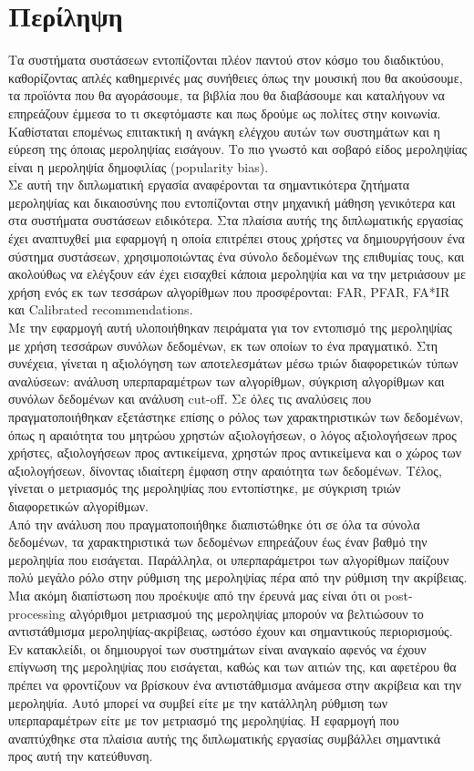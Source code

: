 \chapter{Περίληψη}
\label{abstractname}
\noindent Τα συστήματα συστάσεων εντοπίζονται πλέον παντού στον κόσμο του διαδικτύου, καθορίζοντας απλές καθημερινές μας συνήθειες όπως την μουσική που θα ακούσουμε, τα προϊόντα που θα αγοράσουμε, τα βιβλία που θα διαβάσουμε και καταλήγουν να επηρεάζουν έμμεσα το τι σκεφτόμαστε και πως δρούμε ως πολίτες στην κοινωνία. Καθίσταται επομένως επιτακτική η ανάγκη ελέγχου αυτών των συστημάτων και η εύρεση της όποιας μεροληψίας εισάγουν. Το πιο γνωστό και σοβαρό είδος μεροληψίας είναι η μεροληψία δημοφιλίας (popularity bias). \\
Σε αυτή την διπλωματική εργασία αναφέρονται τα σημαντικότερα ζητήματα μεροληψίας και δικαιοσύνης που εντοπίζονται στην μηχανική μάθηση γενικότερα και στα συστήματα συστάσεων ειδικότερα. Στα πλαίσια αυτής της διπλωματικής εργασίας έχει αναπτυχθεί μια εφαρμογή η οποία επιτρέπει στους χρήστες να δημιουργήσουν ένα σύστημα συστάσεων, χρησιμοποιώντας ένα σύνολο δεδομένων της επιθυμίας τους, και ακολούθως να ελέγξουν εάν έχει εισαχθεί κάποια μεροληψία και να την μετριάσουν με χρήση ενός εκ των τεσσάρων αλγορίθμων που προσφέρονται: FAR, PFAR, FA*IR και Calibrated recommendations.\\
Με την εφαρμογή αυτή υλοποιήθηκαν πειράματα για τον εντοπισμό της μεροληψίας με χρήση τεσσάρων συνόλων δεδομένων, εκ των οποίων το ένα πραγματικό. Στη συνέχεια, γίνεται η αξιολόγηση των αποτελεσμάτων μέσω τριών διαφορετικών τύπων αναλύσεων: ανάλυση υπερπαραμέτρων των αλγορίθμων, σύγκριση αλγορίθμων και συνόλων δεδομένων και ανάλυση cut-off. Σε όλες τις αναλύσεις που πραγματοποιήθηκαν εξετάστηκε επίσης ο ρόλος των χαρακτηριστικών των δεδομένων, όπως η αραιότητα του μητρώου χρηστών αξιολογήσεων, ο λόγος αξιολογήσεων προς χρήστες, αξιολογήσεων προς αντικείμενα, χρηστών προς αντικείμενα και ο χώρος των αξιολογήσεων, δίνοντας ιδιαίτερη έμφαση στην αραιότητα των δεδομένων. Τέλος, γίνεται ο μετριασμός της μεροληψίας που εντοπίστηκε, με σύγκριση τριών διαφορετικών αλγορίθμων.\\
Από την ανάλυση που πραγματοποιήθηκε διαπιστώθηκε ότι σε όλα τα σύνολα δεδομένων, τα χαρακτηριστικά των δεδομένων επηρεάζουν έως έναν βαθμό την μεροληψία που εισάγεται. Παράλληλα, οι υπερπαράμετροι των αλγορίθμων παίζουν πολύ μεγάλο ρόλο στην ρύθμιση της μεροληψίας πέρα από την ρύθμιση την ακρίβειας. Μια ακόμη διαπίστωση που προέκυψε από την έρευνά μας είναι ότι οι post-processing αλγόριθμοι μετριασμού της μεροληψίας μπορούν να βελτιώσουν το αντιστάθμισμα μεροληψίας-ακρίβειας, ωστόσο έχουν και σημαντικούς περιορισμούς. Εν κατακλείδι, οι δημιουργοί των συστημάτων είναι αναγκαίο αφενός να έχουν επίγνωση της μεροληψίας που εισάγεται, καθώς και των αιτιών της, και αφετέρου θα πρέπει να φροντίζουν να βρίσκουν ένα αντιστάθμισμα ανάμεσα στην ακρίβεια και την μεροληψία. Αυτό μπορεί να συμβεί είτε με την κατάλληλη ρύθμιση των υπερπαραμέτρων είτε με τον μετριασμό της μεροληψίας. H εφαρμογή που αναπτύχθηκε στα πλαίσια αυτής της διπλωματικής εργασίας συμβάλλει σημαντικά προς αυτή την κατεύθυνση.

